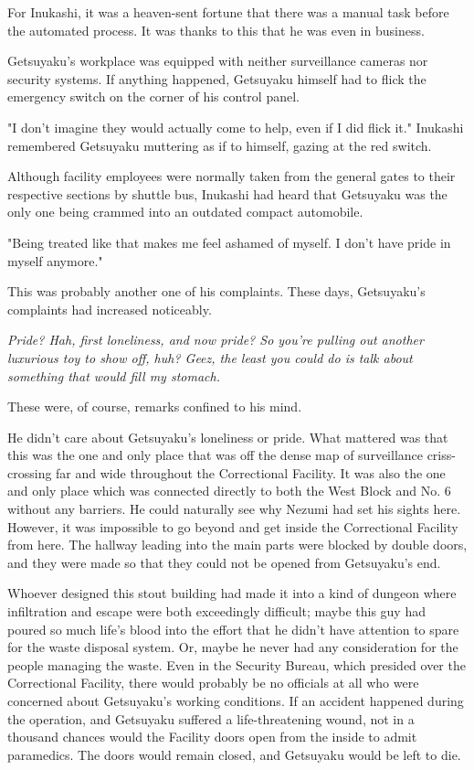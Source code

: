 For Inukashi, it was a heaven-sent fortune that there was a manual task
before the automated process. It was thanks to this that he was even in
business.

Getsuyaku's workplace was equipped with neither surveillance cameras nor
security systems. If anything happened, Getsuyaku himself had to flick
the emergency switch on the corner of his control panel.

"I don't imagine they would actually come to help, even if I did flick
it." Inukashi remembered Getsuyaku muttering as if to himself, gazing at
the red switch.

Although facility employees were normally taken from the general gates
to their respective sections by shuttle bus, Inukashi had heard that
Getsuyaku was the only one being crammed into an outdated compact
automobile.

"Being treated like that makes me feel ashamed of myself. I don't have
pride in myself anymore."

This was probably another one of his complaints. These days, Getsuyaku's
complaints had increased noticeably.

\emph{Pride? Hah, first loneliness, and now pride? So you're pulling out
	another luxurious toy to show off, huh? Geez, the least you could do is
	talk about something that would fill my stomach.}

These were, of course, remarks confined to his mind.

He didn't care about Getsuyaku's loneliness or pride. What mattered was
that this was the one and only place that was off the dense map of
surveillance criss-crossing far and wide throughout the Correctional
Facility. It was also the one and only place which was connected
directly to both the West Block and No. 6 without any barriers. He could
naturally see why Nezumi had set his sights here. However, it was
impossible to go beyond and get inside the Correctional Facility from
here. The hallway leading into the main parts were blocked by double
doors, and they were made so that they could not be opened from
Getsuyaku's end.

Whoever designed this stout building had made it into a kind of dungeon
where infiltration and escape were both exceedingly difficult; maybe
this guy had poured so much life's blood into the effort that he didn't
have attention to spare for the waste disposal system. Or, maybe he
never had any consideration for the people managing the waste. Even in
the Security Bureau, which presided over the Correctional Facility,
there would probably be no officials at all who were concerned about
Getsuyaku's working conditions. If an accident happened during the
operation, and Getsuyaku suffered a life-threatening wound, not in a
thousand chances would the Facility doors open from the inside to admit
paramedics. The doors would remain closed, and Getsuyaku would be left
to die.

